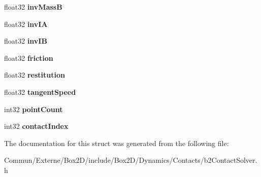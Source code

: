 \begin{DoxyCompactItemize}
\item 
float32 {\bfseries inv\+MassB}\hypertarget{structb2_contact_velocity_constraint_ac75c816e94402ed4d93f232d211d4f62}{}\label{structb2_contact_velocity_constraint_ac75c816e94402ed4d93f232d211d4f62}

\item 
float32 {\bfseries inv\+IA}\hypertarget{structb2_contact_velocity_constraint_ac6c18706a9ee89c5a682dc610e86e00f}{}\label{structb2_contact_velocity_constraint_ac6c18706a9ee89c5a682dc610e86e00f}

\item 
float32 {\bfseries inv\+IB}\hypertarget{structb2_contact_velocity_constraint_aae02d4fd8f60353385b9cc876dc78a81}{}\label{structb2_contact_velocity_constraint_aae02d4fd8f60353385b9cc876dc78a81}

\item 
float32 {\bfseries friction}\hypertarget{structb2_contact_velocity_constraint_a11025786ae828eeeb60dfcd15358d934}{}\label{structb2_contact_velocity_constraint_a11025786ae828eeeb60dfcd15358d934}

\item 
float32 {\bfseries restitution}\hypertarget{structb2_contact_velocity_constraint_a6734f74c1970abc64ed7dcffd8737257}{}\label{structb2_contact_velocity_constraint_a6734f74c1970abc64ed7dcffd8737257}

\item 
float32 {\bfseries tangent\+Speed}\hypertarget{structb2_contact_velocity_constraint_aaf6acabb0ef62eeac647250e2520a272}{}\label{structb2_contact_velocity_constraint_aaf6acabb0ef62eeac647250e2520a272}

\item 
int32 {\bfseries point\+Count}\hypertarget{structb2_contact_velocity_constraint_a1decd7bf6a5dc61bd72d4e87b070a660}{}\label{structb2_contact_velocity_constraint_a1decd7bf6a5dc61bd72d4e87b070a660}

\item 
int32 {\bfseries contact\+Index}\hypertarget{structb2_contact_velocity_constraint_a4c76b9292f28859e2f8c9d075e79b873}{}\label{structb2_contact_velocity_constraint_a4c76b9292f28859e2f8c9d075e79b873}

\end{DoxyCompactItemize}


The documentation for this struct was generated from the following file\+:\begin{DoxyCompactItemize}
\item 
Commun/\+Externe/\+Box2\+D/include/\+Box2\+D/\+Dynamics/\+Contacts/b2\+Contact\+Solver.\+h\end{DoxyCompactItemize}
